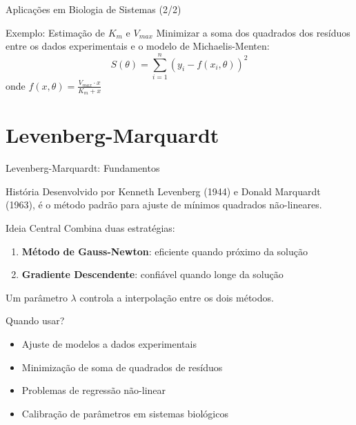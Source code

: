 \begin{frame}{Aplicações em Biologia de Sistemas (2/2)}
\begin{block}{Exemplo: Estimação de $K_m$ e $V_{max}$}
Minimizar a soma dos quadrados dos resíduos entre os dados experimentais e o modelo de Michaelis-Menten:
$$S(\theta) = \sum_{i=1}^{n}(y_i - f(x_i, \theta))^2$$
onde $f(x, \theta) = \frac{V_{max} \cdot x}{K_m + x}$
\end{block}
\end{frame}

\section{Levenberg-Marquardt}

\begin{frame}[shrink=12]{Levenberg-Marquardt: Fundamentos}
\begin{block}{História}
Desenvolvido por Kenneth Levenberg (1944) e Donald Marquardt (1963), é o método padrão para ajuste de mínimos quadrados não-lineares.
\end{block}

\vspace{0.3cm}

\begin{block}{Ideia Central}
Combina duas estratégias:
\begin{enumerate}
    \item \textbf{Método de Gauss-Newton}: eficiente quando próximo da solução
    \item \textbf{Gradiente Descendente}: confiável quando longe da solução
\end{enumerate}
Um parâmetro $\lambda$ controla a interpolação entre os dois métodos.
\end{block}

\vspace{0.3cm}
\begin{block}{Quando usar?}
\begin{itemize}
    \item Ajuste de modelos a dados experimentais
    \item Minimização de soma de quadrados de resíduos
    \item Problemas de regressão não-linear
    \item Calibração de parâmetros em sistemas biológicos
\end{itemize}
\end{block}
\end{frame}

